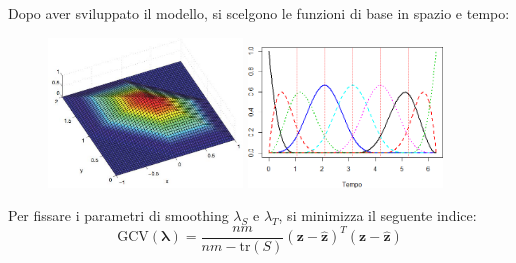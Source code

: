 \documentclass[landscape,9pt]{beamer}                           %
\begin{document}
\begin{frame}
Dopo aver sviluppato il modello, si scelgono le funzioni di base in spazio e tempo:
\begin{figure}[t]
	\centering
	\subfigure
	{
	\includegraphics[width=0.46\textwidth]{Immagini/elementofinito.jpg}  
   }
	\subfigure
   {
	\includegraphics[width=0.46\textwidth]{Immagini/Bsplines.png}
   }
\end{figure}
{
	Per fissare i parametri di smoothing $\lambda_S$ e $\lambda_T$, si minimizza il seguente indice:
$$
\mathrm{GCV}(\bm \lambda) =\frac{nm}{nm-\text{tr}(S)}  (\bm z - \hat  {\bm z})^T(\bm z - \hat  {\bm z})
$$
}

\end{frame}
\end{document}
